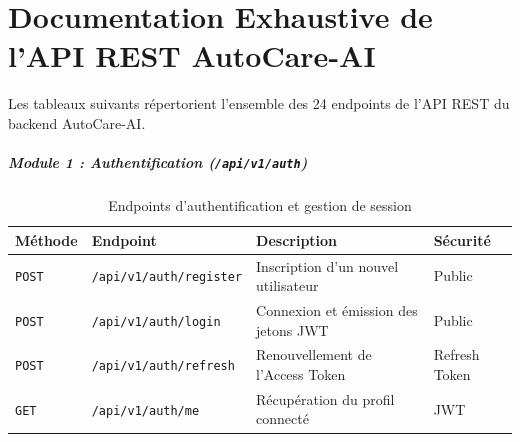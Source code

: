 \documentclass[12pt,a4paper,oneside]{report}
\begin{document}
\clearpage

\appendix

\chapter{Documentation Exhaustive de l'API REST AutoCare-AI}
\label{anx:api_rest}

Les tableaux suivants r\'epertorient l'ensemble des 24 endpoints de l'API REST du backend AutoCare-AI.

\paragraph{Module 1 : Authentification (\texttt{/api/v1/auth})}
\begin{table}[H]
\centering
\small
\begin{tabularx}{\textwidth}{p{1.4cm} p{4.8cm} X p{2cm}}
\toprule
\textbf{M\'ethode} & \textbf{Endpoint} & \textbf{Description} & \textbf{S\'ecurit\'e} \\
\midrule
\texttt{POST} & \texttt{/api/v1/auth/register} & Inscription d'un nouvel utilisateur & Public \\
\texttt{POST} & \texttt{/api/v1/auth/login} & Connexion et \'emission des jetons JWT & Public \\
\texttt{POST} & \texttt{/api/v1/auth/refresh} & Renouvellement de l'Access Token & Refresh Token \\
\texttt{GET} & \texttt{/api/v1/auth/me} & R\'ecup\'eration du profil connect\'e & JWT \\
\bottomrule
\end{tabularx}
\caption{Endpoints d'authentification et gestion de session}
\end{table}
\end{document}
